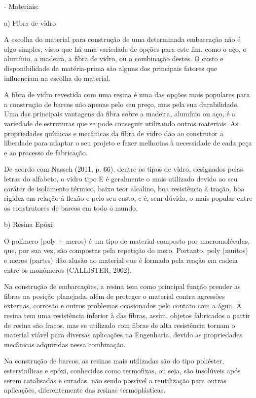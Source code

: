 - Materiais:


a) Fibra de vidro

A escolha do material para construção de uma determinada embarcação não é algo simples, visto que há uma variedade de opções para este fim, como o aço, o alumínio, a madeira, a fibra de vidro, ou a combinação destes. O custo e disponibilidade da matéria-prima são alguns dos principais fatores que influenciam na escolha do material.

A fibra de vidro revestida com uma resina é uma das opções mais populares para a construção de barcos não apenas pelo seu preço, mas pela sua durabilidade. Uma das principais vantagens da fibra sobre a madeira, alumínio ou aço, é a variedade de estruturas que se pode conseguir utilizando outros materiais. As propriedades químicas e mecânicas da fibra de vidro dão ao construtor a liberdade para adaptar o seu projeto e fazer melhorias à necessidade de cada peça e ao processo de fabricação.

De acordo com Nasseh (2011, p. 66), dentre os tipos de vidro, designados pelas letras do alfabeto, o vidro tipo E é geralmente o mais utilizado devido ao seu caráter de isolamento térmico, baixo teor alcalino, boa resistência à tração, boa rigidez em relação á flexão e pelo seu custo, e é, sem dúvida, o mais popular entre os construtores de barcos em todo o mundo. 


b) Resina Epóxi

O polímero (poly + meros) é um tipo de material composto por macromoléculas, que, por sua vez, são compostas pela repetição do mero. Portanto, poly (muitos) e meros (partes) dão alusão ao material que é formado pela reação em cadeia entre os monômeros (CALLISTER, 2002).

Na construção de embarcações, a resina tem como principal função prender as fibras na posição planejada, além de proteger o material contra agressões externas, corrosão e outros problemas ocasionados pelo contato com a água. A resina tem uma resistência inferior à das fibras, assim, objetos fabricados a partir de resina são fracos, mas se utilizado com fibras de alta resistência tornam o material viável para diversas aplicações na Engenharia, devido as propriedades mecânicas adquiridas nessa combinação. 

Na construção de barcos, as resinas mais utilizadas são do tipo poliéster, estervinílicas e epóxi, conhecidas como termofixas, ou seja, são insolúveis após serem catalisadas e curadas, não sendo possível a reutilização para outras aplicações, diferentemente das resinas termoplásticas. 



